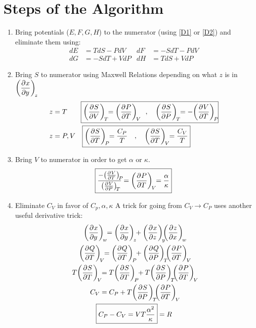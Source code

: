 \documentclass{article}
\begin{document}
\section*{Steps of the Algorithm}
    \begin{enumerate}
        \item Bring potentials ($E,F,G,H$) to the numerator (using \ref{D1} or \ref{D2}) and eliminate them using:
        \begin{align*}
            dE&=TdS-PdV
            &
            dF&=-SdT-PdV
            \\
            dG&=-SdT+VdP
            &
            dH&=TdS+VdP
        \end{align*}
        \item Bring $S$ to numerator using Maxwell Relations depending on what $z$ is in $\displaystyle\pder{x}{y}[z]$
        \begin{align*}
            z&=T\qquad\boxed{\pder{S}{V}[T]=\pder{P}{T}[V]\quad,\quad \pder{S}{P}[T]=-\pder{V}{T}[P]}
            \\
            z&=P,V\quad\boxed{\pder{S}{T}[P]=\frac{C_P}{T}\quad,\quad \pder{S}{T}[V]=\frac{C_V}{T}}
        \end{align*}
        \item Bring $V$ to numerator in order to get $\alpha$ or $\kappa$. 
        \begin{align*}
            \boxed{\frac{-\pder{V}{T}[P]}{\pder{V}{P}[T]}=\pder{P}{T}[V]=\frac{\alpha}{\kappa}}
        \end{align*}
        \item Eliminate $C_V$ in favor of $C_p,\alpha,\kappa$
        A trick for going from $C_V\rightarrow C_P$ uses another useful derivative trick:
        \begin{gather*}
            \pder{x}{y}[w]=\pder{x}{y}[z]+\pder{x}{z}[y]\pder{z}{x}[w]
            \\
            \pder{Q}{T}[V]=\pder{Q}{T}[P]+\pder{Q}{P}[T]\pder{P}{T}[V]
            \\
            T\pder{S}{T}[V]=T\pder{S}{T}[P]+T\pder{S}{P}[T]\pder{P}{T}[V]
            \\
            C_V=C_P+T\pder{S}{P}[T]\pder{P}{T}[V]
            \\
            \boxed{C_P-C_V=VT\frac{\alpha^2}{\kappa}}=R                 
        \end{gather*}
    \end{enumerate} 
\end{document}
